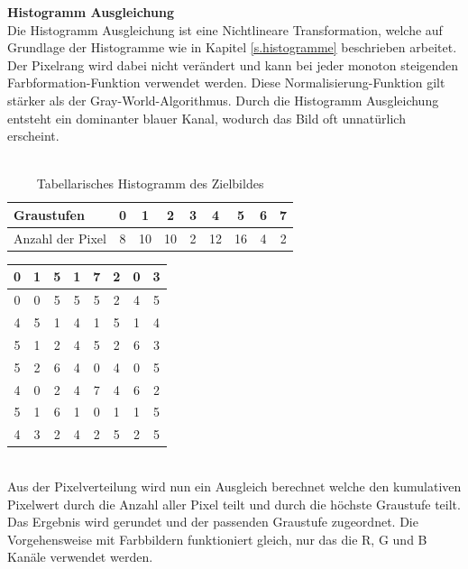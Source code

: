 \documentclass[a4paper,12pt,oneside]{article}
\begin{document}
  \textbf{Histogramm Ausgleichung}\label{s.ha}\\
  Die Histogramm Ausgleichung ist eine Nichtlineare Transformation, welche auf Grundlage der Histogramme wie in Kapitel \ref{s.histogramme} beschrieben arbeitet. Der Pixelrang wird dabei nicht verändert und kann bei jeder monoton steigenden Farbformation-Funktion verwendet werden. Diese Normalisierung-Funktion gilt stärker als der Gray-World-Algorithmus. Durch die Histogramm Ausgleichung entsteht ein dominanter blauer Kanal, wodurch das Bild oft unnatürlich erscheint.\\\\
  \begin{table}
  [h]
  \caption{Tabellarisches Histogramm des Zielbildes}
  \centering
  \begin{tabular}{|l|c|c|c|c|c|c|c|c|}
  \hline
  Graustufen & 0 & 1 & 2 & 3 & 4 & 5 & 6 & 7\\
  \hline
  Anzahl der Pixel & 8 & 10 & 10 & 2 & 12 & 16 & 4 & 2\\
  \hline
  \end{tabular}
  \end{table}
  \begin{table}
  [h]
  \centering
  \begin{tabular}{|c|c|c|c|c|c|c|c|}
  \hline
  0&1&5&1&7&2&0&3\\
  \hline
  0&0&5&5&5&2&4&5\\
  \hline
  4&5&1&4&1&5&1&4\\
  \hline
  5&1&2&4&5&2&6&3\\
  \hline
  5&2&6&4&0&4&0&5\\
  \hline
  4&0&2&4&7&4&6&2\\
  \hline
  5&1&6&1&0&1&1&5\\
  \hline
  4&3&2&4&2&5&2&5\\
  \hline
  \end{tabular}
  \end{table}\\
  Aus der Pixelverteilung wird nun ein Ausgleich berechnet welche den kumulativen Pixelwert durch die Anzahl aller Pixel teilt und durch die höchste Graustufe teilt. Das Ergebnis wird gerundet und der passenden Graustufe zugeordnet. Die Vorgehensweise mit Farbbildern funktioniert gleich, nur das die R, G und B Kanäle verwendet werden.
\end{document}
